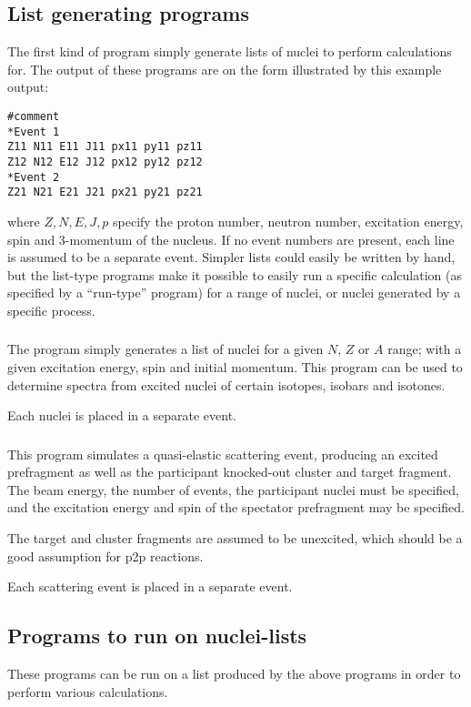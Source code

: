 \subsection{List generating programs}
The first kind of program simply generate lists of nuclei to perform calculations for. The output of these programs are on the form illustrated by this example output:
\begin{lstlisting}
#comment
*Event 1
Z11 N11 E11 J11 px11 py11 pz11
Z12 N12 E12 J12 px12 py12 pz12
*Event 2
Z21 N21 E21 J21 px21 py21 pz21
\end{lstlisting}
where $Z,N,E,J,p$ specify the proton number, neutron number, excitation energy, spin and 3-momentum of the nucleus. If no event numbers are present, each line is assumed to be a separate event. Simpler lists could easily be written by hand, but the list-type programs make it possible to easily run a specific calculation (as specified by a ``run-type'' program) for a range of nuclei, or nuclei generated by a specific process.

\subsubsection{}
The  program simply generates a list of nuclei for a given $N$, $Z$ or $A$ range; with a given excitation energy, spin and initial momentum. This program can be used to determine spectra from excited nuclei of certain isotopes, isobars and isotones.

Each nuclei is placed in a separate event.

\subsubsection{}
This program simulates a quasi-elastic scattering event, producing an excited prefragment as well as the participant knocked-out cluster and target fragment.
The beam energy, the number of events, the participant nuclei must be specified, and the excitation energy and spin of the spectator prefragment may be specified.

The target and cluster fragments are assumed to be unexcited, which should be a good assumption for p2p reactions.

Each scattering event is placed in a separate event.

\subsection{Programs to run on nuclei-lists}
These programs can be run on a list produced by the above programs in order to perform various calculations. 

